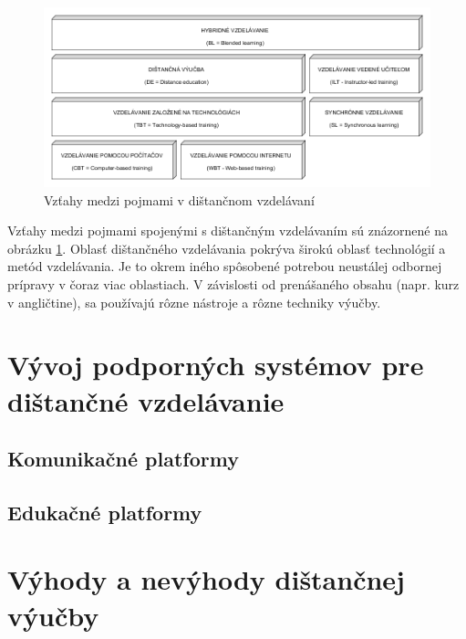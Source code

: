 \documentclass[10pt,oneside,slovak,a4paper]{article}
\begin{document}
\begin{figure}[h]
	\centering
	\includegraphics[width=\textwidth]{Vztahy_DE.png}
	\caption{Vzťahy medzi pojmami v dištančnom vzdelávaní\cite{WiktorzakKotowski}}
	\label{Vztahy_medzi_pojmami}
\end{figure}

Vzťahy medzi pojmami spojenými s dištančným vzdelávaním sú znázornené na obrázku \ref{Vztahy_medzi_pojmami}.
Oblasť dištančného vzdelávania pokrýva širokú oblasť technológií a metód vzdelávania. 
Je to okrem iného spôsobené potrebou neustálej odbornej prípravy v čoraz viac oblastiach.
V závislosti od prenášaného obsahu (napr. kurz v angličtine), sa používajú rôzne nástroje a rôzne techniky výučby.\cite{WiktorzakKotowski}

\section{Vývoj podporných systémov pre dištančné vzdelávanie}%


\subsection{Komunikačné platformy}
\subsection{Edukačné platformy}


\section{Výhody a nevýhody dištančnej výučby}
\end{document}
